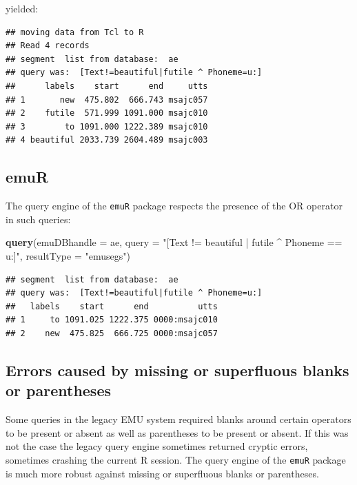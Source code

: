 \documentclass[]{book}
\newenvironment{Shaded}{\begin{snugshade}}{\end{snugshade}}
\newcommand{\DataTypeTok}[1]{\textcolor[rgb]{0.13,0.29,0.53}{#1}}
\newcommand{\KeywordTok}[1]{\textcolor[rgb]{0.13,0.29,0.53}{\textbf{#1}}}
\newcommand{\NormalTok}[1]{#1}
\newcommand{\StringTok}[1]{\textcolor[rgb]{0.31,0.60,0.02}{#1}}
\begin{document}
yielded:

\begin{verbatim}
## moving data from Tcl to R
## Read 4 records
## segment  list from database:  ae
## query was:  [Text!=beautiful|futile ^ Phoneme=u:]
##      labels    start      end     utts
## 1       new  475.802  666.743 msajc057
## 2    futile  571.999 1091.000 msajc010
## 3        to 1091.000 1222.389 msajc010
## 4 beautiful 2033.739 2604.489 msajc003
\end{verbatim}

\hypertarget{emur-1}{%
\subsection{emuR}\label{emur-1}}

The query engine of the \texttt{emuR} package respects the presence of the OR operator in such queries:

\begin{Shaded}
\begin{Highlighting}[]
\KeywordTok{query}\NormalTok{(}\DataTypeTok{emuDBhandle =}\NormalTok{ ae,}
      \DataTypeTok{query =} \StringTok{"[Text != beautiful | futile ^ Phoneme == u:]"}\NormalTok{,}
      \DataTypeTok{resultType =} \StringTok{"emusegs"}\NormalTok{)}
\end{Highlighting}
\end{Shaded}

\begin{verbatim}
## segment  list from database:  ae
## query was:  [Text!=beautiful|futile ^ Phoneme=u:]
##   labels    start      end          utts
## 1     to 1091.025 1222.375 0000:msajc010
## 2    new  475.825  666.725 0000:msajc057
\end{verbatim}

\hypertarget{errors-caused-by-missing-or-superfluous-blanks-or-parentheses}{%
\subsection{Errors caused by missing or superfluous blanks or parentheses}\label{errors-caused-by-missing-or-superfluous-blanks-or-parentheses}}

Some queries in the legacy EMU system required blanks around certain operators to be present or absent as well as parentheses to be present or absent. If this was not the case the legacy query engine sometimes returned cryptic errors, sometimes crashing the current R session. The query engine of the \texttt{emuR} package is much more robust against missing or superfluous blanks or parentheses.
\end{document}
